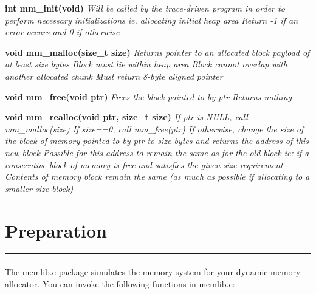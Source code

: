 \documentclass[a4paper]{article}
\newcommand\tab[1][1cm]{\hspace*{#1}}
\begin{document}
{\bf int mm\_init(void)}\newline
	{\it  \tab Will be called by the trace-driven program in order to perform necessary \tab initializations\newline
	\tab	\tab ie. allocating initial heap area\newline
	\tab Return -1 if an error occurs and 0 if otherwise\newline }

{\bf void \*mm\_malloc(size\_t size)}\newline
	{\it \tab Returns pointer to an allocated block payload of at least size bytes\newline
	\tab Block must lie within heap area\newline
	\tab Block cannot overlap with another allocated chunk\newline
	\tab Must return 8-byte aligned pointer\newline }

{\bf void mm\_free(void \*ptr)}\newline
	{\it\tab Frees the block pointed to by ptr\newline
	\tab Returns nothing\newline}

{\bf void \*mm\_realloc(void \*ptr, size\_t size)}\newline
	{\it \tab If ptr is NULL, call mm\_malloc(size)\newline
	\tab If size==0, call mm\_free(ptr)\newline
	\tab If otherwise, change the size of the block of memory pointed to by ptr to \tab size bytes and returns the address of this new block\newline
		\tab \tab Possible for this address to remain the same as for the old block\newline
		\tab\tab\tab ie:  if a consecutive block of memory is free and satisfies the \tab \tab \tab given size requirement\newline 
		\tab \tab Contents of memory block remain the same (as much as possible \tab \tab if allocating to a smaller size block)\newline }



\section{Preparation}
\noindent\rule{2cm}{0.4pt}
\paragraph{}   
The memlib.c package simulates the memory system for your dynamic memory allocator. You can invoke
the following functions in memlib.c:    
  \newline   
  
\end{document}
